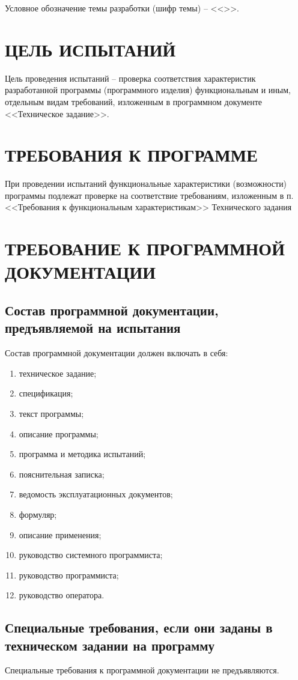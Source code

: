 \documentclass[14pt,a4paper,final]{extreport}
\begin{document}
Условное обозначение темы разработки (шифр темы) -- <<\cipher>>.

\chapter{ЦЕЛЬ ИСПЫТАНИЙ}
Цель проведения испытаний – проверка соответствия характеристик разработанной программы (программного изделия) функциональным и иным, отдельным видам требований, изложенным в программном документе <<Техническое задание>>.

\chapter{ ТРЕБОВАНИЯ К ПРОГРАММЕ}
При проведении испытаний функциональные характеристики (возможности) программы подлежат проверке на соответствие требованиям, изложенным в п. <<Требования к функциональным характеристикам>> Технического задания

\chapter{ТРЕБОВАНИЕ К ПРОГРАММНОЙ ДОКУМЕНТАЦИИ}
\section{Состав программной документации, предъявляемой на испытания}
Состав программной документации должен включать в себя:
\begin{enumerate}
	\item техническое задание;
	\item спецификация;
	\item текст программы;
	\item описание программы;
	\item программа и методика испытаний;
	\item пояснительная записка;
	\item ведомость эксплуатационных документов;
	\item формуляр;
	\item описание применения;
	\item руководство системного программиста;
	\item руководство программиста;
	\item руководство оператора.
\end{enumerate}

\section{Специальные требования, если они заданы в техническом задании на программу}
Специальные требования к программной документации не предъявляются.
\end{document}
